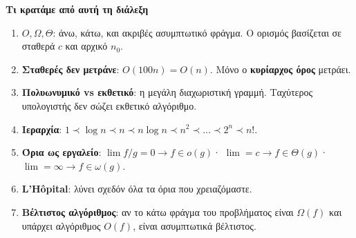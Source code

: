 \documentclass[11pt,a4paper]{article}
\begin{document}
\begin{recapbox}
\textbf{Τι κρατάμε από αυτή τη διάλεξη}
\begin{enumerate}
  \item \textbf{$O, \Omega, \Theta$}: άνω, κάτω, και ακριβές ασυμπτωτικό φράγμα.
  Ο ορισμός βασίζεται σε σταθερά $c$ και αρχικό $n_0$.
  \item \textbf{Σταθερές δεν μετράνε}: $O(100n) = O(n)$. Μόνο ο \textbf{κυρίαρχος
  όρος} μετράει.
  \item \textbf{Πολυωνυμικό vs εκθετικό}: η μεγάλη διαχωριστική γραμμή. Ταχύτερος
  υπολογιστής δεν σώζει εκθετικό αλγόριθμο.
  \item \textbf{Ιεραρχία}: $1 \prec \log n \prec n \prec n \log n \prec n^2 \prec
  \dots \prec 2^n \prec n!$.
  \item \textbf{Όρια ως εργαλείο}: $\lim f/g = 0 \to f \in o(g)$· $\lim = c \to
  f \in \Theta(g)$· $\lim = \infty \to f \in \omega(g)$.
  \item \textbf{L'Hôpital}: λύνει σχεδόν όλα τα όρια που χρειαζόμαστε.
  \item \textbf{Βέλτιστος αλγόριθμος}: αν το κάτω φράγμα του προβλήματος είναι
  $\Omega(f)$ και υπάρχει αλγόριθμος $O(f)$, είναι ασυμπτωτικά βέλτιστος.
\end{enumerate}
\end{recapbox}

\lecturefooter
\end{document}
